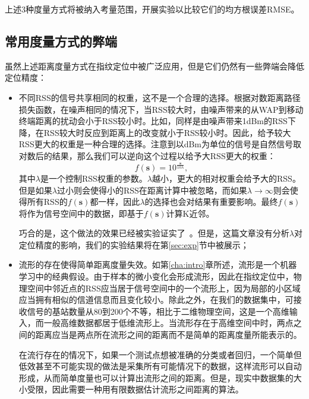 上述3种度量方式将被纳入考量范围，开展实验以比较它们的均方根误差RMSE。

\subsection{常用度量方式的弊端}

虽然上述距离度量方式在指纹定位中被广泛应用，但是它们仍然有一些弊端会降低定位精度：
\begin{itemize}
	\item 不同RSS的信号共享相同的权重，这不是一个合理的选择。根据对数距离路径损失函数，在噪声相同的情况下，当RSS较大时，由噪声带来的从WAP到移动终端距离的扰动会小于RSS较小时。比如，同样是由噪声带来1dBm的RSS下降，在RSS较大时反应到距离上的改变就小于RSS较小时。因此，给予较大RSS更大的权重是一种合理的选择。注意到以dBm为单位的信号是自然信号取对数后的结果，那么我们可以逆向这个过程以给予大RSS更大的权重：
	\begin{equation}
	f(\mathbf{s}) = \mathrm{10}^{\frac{\mathbf{s}}{10\lambda}}, \label{eq:exp}
	\end{equation}
	其中$\lambda$是一个控制RSS权重的参数。$\lambda$越小，更大的相对权重会给予大的RSS。但是如果$\lambda$过小则会使得小的RSS在距离计算中被忽略，而如果$\lambda \rightarrow \infty$则会使得所有RSS的$f(\mathbf{s})$都一样，因此$\lambda$的选择也会对结果有重要影响。最终$f(\mathbf{s})$将作为信号空间中的数据，即基于$f(\mathbf{s})$计算K近邻。
	
	巧合的是，这个做法的效果已经被实验证实了~\cite{torres2015comprehensive}。但是，这篇文章没有分析$\lambda$对定位精度的影响，我们的实验结果将在第\ref{sec:exp}节中被展示；
	
	\item 流形的存在使得简单距离度量失效。如第\ref{cha:intro}章所述，流形是一个机器学习中的经典假设。由于样本的微小变化会形成流形，因此在指纹定位中，物理空间中邻近点的RSS应当居于信号空间中的一个流形上，因为局部的小区域应当拥有相似的信道信息而且变化较小。除此之外，在我们的数据集中，可接收信号的基站数量从80到200个不等，相比于二维物理空间，这是一个高维输入，而一般高维数据都居于低维流形上。当流形存在于高维空间中时，两点之间的距离应当是两点所在流形之间的距离而不是简单的距离度量所能表示的。
	
	在流行存在的情况下，如果一个测试点想被准确的分类或者回归，一个简单但低效甚至不可能实现的做法是采集所有可能情况下的数据，这样流形可以自动形成，从而简单度量也可以计算出流形之间的距离。但是，现实中数据集的大小受限，因此需要一种用有限数据估计流形之间距离的算法。
\end{itemize}

